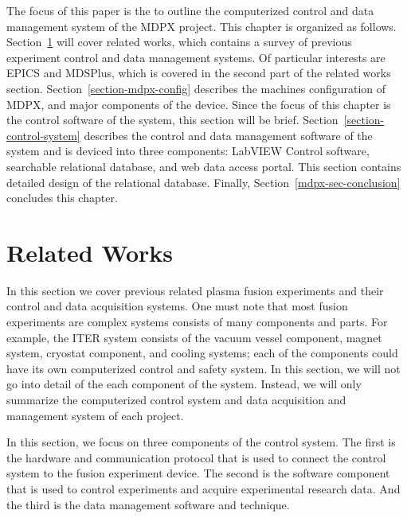 The focus of this paper is the to outline the computerized control and data management system of the MDPX project. This chapter is organized as follows. Section~\ref{section-related-works} will cover related works, which contains a survey of previous experiment control and data management systems. Of particular interests are EPICS\cite{lecture:johnson_intro_to_epics} and MDSPlus\cite{stillerman1997mdsplus}, which is covered in the second part of the related works section. Section~\ref{section-mdpx-config} describes the machines configuration of MDPX, and major components of the device. Since the focus of this chapter is the control software of the system, this section will be brief. Section~\ref{section-control-system} describes the control and data management software of the system and is deviced into three components: LabVIEW Control software, searchable relational database, and web data access portal. This section contains detailed design of the relational database. Finally, Section~\ref{mdpx-sec-conclusion} concludes this chapter.


\section{Related Works}\label{section-related-works}

In this section we cover previous related plasma fusion experiments and their control and data acquisition systems. One must note that most fusion experiments are complex systems consists of many components and parts. For example, the ITER\cite{Rebut199585} system consists of the vacuum vessel component, magnet system, cryostat component, and cooling systems; each of the components could have its own computerized control and safety system. In this section, we will not go into detail of the each component of the system. Instead, we will only summarize the computerized control system and data acquisition and management system of each project.

In this section, we focus on three components of the control system. The first is the hardware and communication protocol that is used to connect the control system to the fusion experiment device. The second is the software component that is used to control experiments and acquire experimental research data. And the third is the data management software and technique.

